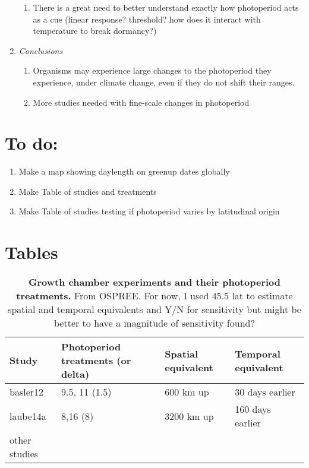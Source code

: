 \documentclass{article}
\begin{document}
\begin{enumerate}
\begin{enumerate}
\item There is a great need to better understand exactly how photoperiod acts as a cue (linear response? threshold? how does it interact with temperature to break dormancy?)
\end{enumerate}
\item\textit{Conclusions}
\begin{enumerate}
\item Organisms may experience large changes to the photoperiod they experience, under climate change, even if they do not shift their ranges.
\item More studies needed with fine-scale changes in photoperiod
\end{enumerate}
\end{enumerate}

\section* {To do:}
\begin{enumerate}
\item Make a map showing daylength on greenup dates globally 
\item Make Table of studies and treatments
\item Make Table of studies testing if photoperiod varies by latitudinal origin
\end{enumerate}

\clearpage
\section* {Tables}

\begin{table}[p]
  \caption{\textbf{Growth chamber experiments and their photoperiod treatments.} From OSPREE. For now, I used 45.5 lat to estimate spatial and temporal equivalents and Y/N for sensitivity but might be better to have a magnitude of sensitivity found?}
\begin{footnotesize} 
   \begin{tabular}{| p{1cm} | p{3.8cm} | p{2.9 cm} | p{3.2 cm} |}
    \hline
  \bf{Study} & \bf{Photoperiod treatments (or delta)} & \bf{Spatial equivalent} & \bf{Temporal equivalent}\\ \hline
    basler12 & 9.5, 11 (1.5) &  600 km up & 30 days earlier \\ \hline
    laube14a & 8,16 (8) &  3200 km up & 160 days earlier \\ \hline
    other studies &  &   & \\ \hline

     \end{tabular}    
\end{footnotesize} 
    \end{table}
\clearpage
\end{document}
